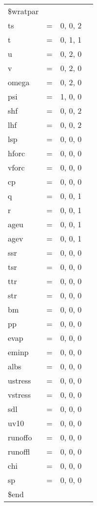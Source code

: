\newpage
\begin{tabular}{llll}
                         \\
\$wratpar                 \\
 ts    &  = & 0,      0,          2 \\
 t     &  = & 0,      1, 	  1 \\
 u     &  = & 0,      2,	  0 \\
 v     &  = & 0,      2,	  0 \\
 omega &  = & 0,      2,	  0 \\
 psi   &  = & 1,      0,	  0 \\
 shf   &  = & 0,      0,	  2 \\
 lhf   &  = & 0,      0,	  2 \\
 lsp   &  = & 0,      0, 	  0 \\
 hforc &  = & 0,      0,          0 \\
 vforc &  = & 0,      0,          0 \\
 cp    &  = & 0,      0, 	  0 \\
 q     &  = & 0,      0,          1 \\
 r     &  = & 0,      0,          1 \\
 ageu  &  = & 0,      0,          1 \\
 agev  &  = & 0,      0,          1 \\
 ssr   &  = & 0,      0,          0 \\
 tsr   &  = & 0,      0,          0 \\
 ttr   &  = & 0,      0,          0 \\
 str   &  = & 0,      0,          0 \\
 bm    &  = & 0,      0, 	  0 \\
 pp    &  = & 0,      0, 	  0 \\
 evap  &  = & 0,      0,	  0 \\
 eminp &  = & 0,      0,	  0 \\
 albs  &  = & 0,      0,	  0 \\
 ustress  &  = & 0,      0,	  0 \\
 vstress  &  = & 0,      0,	  0 \\
 sdl      &  = & 0,      0,	  0 \\
 uv10     &  = & 0,      0,	  0 \\
 runoffo  &  = & 0,      0,	  0 \\
 runoffl  &  = & 0,      0,	  0 \\
 chi      &  = & 0,      0,	  0 \\
 sp       &  = & 0,      0,	  0 \\
\$end                    \\
\end{tabular}
